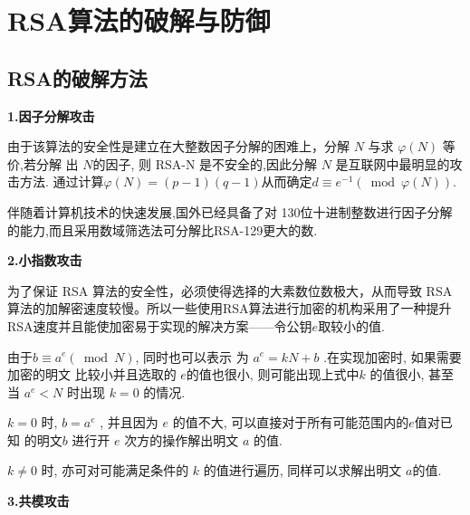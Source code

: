 \documentclass[a4paper,12pt]{article}
\newcommand{\upcite}[1]{\textsuperscript{\textsuperscript{\cite{#1}}}}
\begin{document}


\section{RSA算法的破解与防御}

\subsection{RSA的破解方法}

\textbf{1.因子分解攻击}\par

由于该算法的安全性是建立在大整数因子分解的困难上，分解 $N $ 与求 $ \varphi(N)$  等价,若分解 出  $N $的因子, 则 RSA-N 是不安全的,因此分解 $ N$  是互联网中最明显的攻击方法. 通过计算$\varphi(N)=(p-1)(q-1)$从而确定$d \equiv e^{-1}(\bmod \varphi(N))$.\par 
伴随着计算机技术的快速发展,国外已经具备了对 130位十进制整数进行因子分解的能力,而且采用数域筛选法可分解比RSA-129更大的数.\upcite{黑客破解}\par 
\quad  \par 



\textbf{2.小指数攻击}\par

为了保证 RSA 算法的安全性，必须使得选择的大素数位数极大，从而导致 RSA 算法的加解密速度较慢。所以一些使用RSA算法进行加密的机构采用了一种提升RSA速度并且能使加密易于实现的解决方案——令公钥$e$取较小的值.\par 
由于$b\equiv a^{e} (\bmod N)$, 同时也可以表示 为 $ a^{e}=k N+b$  .在实现加密时, 如果需要加密的明文 比较小并且选取的  $e$的值也很小, 则可能出现上式中$k$ 的值很小, 甚至当  $a^{e}<N$  时出现  $k=0 $ 的情况.\par 
 $k=0$  时,  $b=a^e$ , 并且因为 $ e $ 的值不大, 可以直接对于所有可能范围内的$ e $值对已知 的明文$b$ 进行开 $e$ 次方的操作解出明文 $a$ 的值.\par 
$k\neq 0 $ 时, 亦可对可能满足条件的 $ k $ 的值进行遍历, 同样可以求解出明文 $a $的值. \upcite{python破解} \par
\quad  \par 



\textbf{3.共模攻击}\par
\end{document}
